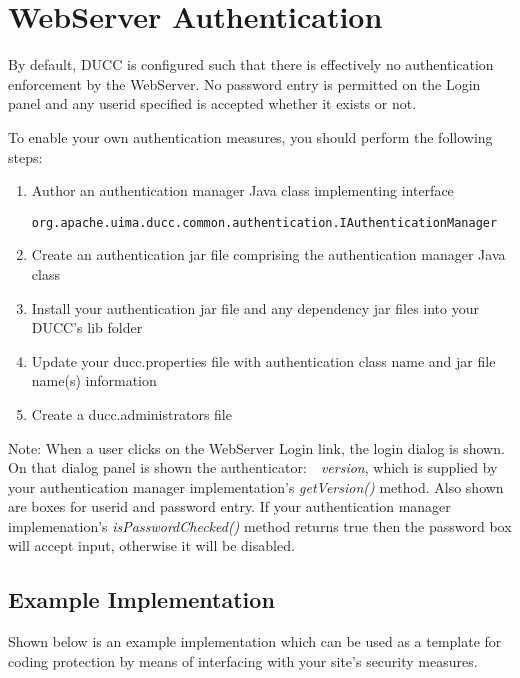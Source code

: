 \section{WebServer Authentication}
\label{sec:WebServer Authentication}

    By default, DUCC is configured such that there is effectively no
    authentication enforcement by the WebServer. No password entry is permitted
    on the Login panel and any userid specified is accepted whether it exists or
    not.
    
    To enable your own authentication measures, you should perform the following
    steps:
    
    \begin{enumerate}
      \item Author an authentication manager Java class implementing interface
      \begin{verbatim}
org.apache.uima.ducc.common.authentication.IAuthenticationManager
      \end{verbatim}
      \item Create an authentication jar file comprising the
      authentication manager Java class
      \item Install your authentication jar file and any dependency jar files
      into your DUCC's lib folder
      \item Update your ducc.properties file with authentication class name
      and jar file name(s) information
      \item Create a ducc.administrators file
      \end{enumerate}
      
    Note: When a user clicks on the WebServer Login link, the login dialog is
    shown. On that dialog panel is shown the \mbox{authenticator: {\em
    version}}, which is supplied by your authentication manager implementation's {\em
    \mbox{getVersion()}} method. Also shown are boxes for userid and password
    entry. If your authentication manager implemenation's {\em \mbox{isPasswordChecked()}}
    method returns true then the password box will accept input, otherwise it will be
    disabled.
    
\subsection{Example Implementation}
    
    Shown below is an example implementation which can be used as a template
    for coding protection by means of interfacing with your site's security
    measures.
    
